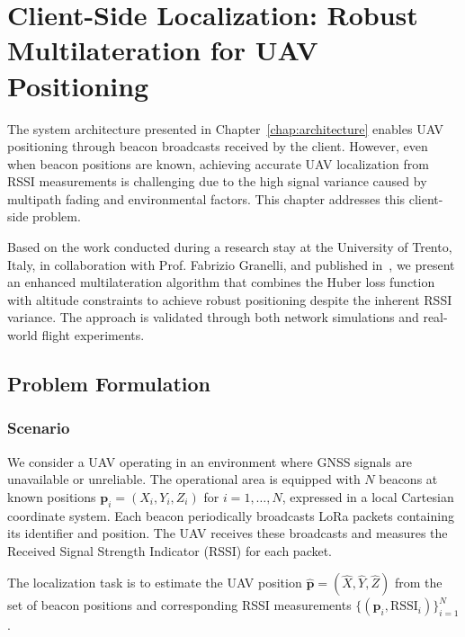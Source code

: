 \documentclass[master,final,11pt]{iscs-thesis}
\begin{document}
\chapter{Client-Side Localization: Robust Multilateration for UAV Positioning}
\label{chap:uav_localization}

The system architecture presented in Chapter~\ref{chap:architecture} enables UAV positioning through beacon broadcasts received by the client.
However, even when beacon positions are known, achieving accurate UAV localization from RSSI measurements is challenging due to the high signal variance caused by multipath fading and environmental factors.
This chapter addresses this client-side problem.

Based on the work conducted during a research stay at the University of Trento, Italy, in collaboration with Prof. Fabrizio Granelli, and published in~\cite{hirotsu2024lora}, we present an enhanced multilateration algorithm that combines the Huber loss function with altitude constraints to achieve robust positioning despite the inherent RSSI variance.
The approach is validated through both network simulations and real-world flight experiments.

\section{Problem Formulation}
\label{sec:uav_problem}

\subsection{Scenario}

We consider a UAV operating in an environment where GNSS signals are unavailable or unreliable.
The operational area is equipped with $N$ beacons at known positions $\mathbf{p}_i = (X_i, Y_i, Z_i)$ for $i = 1, \ldots, N$, expressed in a local Cartesian coordinate system.
Each beacon periodically broadcasts LoRa packets containing its identifier and position.
The UAV receives these broadcasts and measures the Received Signal Strength Indicator (RSSI) for each packet.

The localization task is to estimate the UAV position $\hat{\mathbf{p}} = (\hat{X}, \hat{Y}, \hat{Z})$ from the set of beacon positions and corresponding RSSI measurements $\{(\mathbf{p}_i, \text{RSSI}_i)\}_{i=1}^{N}$.
\end{document}
